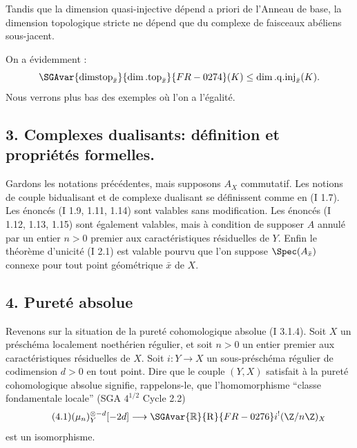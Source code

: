 Tandis que la dimension quasi-injective dépend a priori de l'Anneau 
de base, la
dimension topologique stricte ne dépend que du complexe de faisceaux abéliens sous-jacent.

On a évidemment :
\[
        \SGAvar{\operatorname{dimstop}_{\bar{x}}}{\dim.\mathrm{top}_{\bar{x}}}{FR-0274}(K)\leq \dim.\mathrm{q.inj}_{\bar{x}}(K).
\]
Nous verrons plus bas des exemples où l'on a l'égalité.

\subsection*{3. Complexes dualisants: définition et propriétés formelles.}

Gardons les notations précédentes, mais supposons $A_X$ commutatif. Les notions de couple bidualisant et de complexe dualisant se définissent comme en (I 1.7). Les énoncés (I 1.9, 1.11, 1.14) sont valables sans modification. Les énoncés (I 1.12, 1.13, 1.15) sont également valables, mais à condition de supposer $A$ annulé par un entier $n>0$ premier aux caractéristiques résiduelles de $Y$. Enfin le théorème d'unicité (I 2.1) est valable pourvu que l'on suppose $\Spec(A_{\bar{x}})$ connexe pour tout point géométrique $\bar{x}$ de $X$.

\subsection*{4. Pureté absolue}

Revenons sur la situation de la pureté cohomologique absolue (I 3.1.4). Soit $X$ un préschéma localement noethérien régulier, et soit $n>0$ un entier premier aux caractéristiques résiduelles de $X$. Soit $i:Y\to X$ un sous-préschéma régulier de codimension $d>0$ en tout point. Dire que le couple $(Y,X)$ satisfait à la pureté cohomologique absolue signifie, rappelons-le, que l'homomorphisme ``classe fondamentale locale'' (SGA $4^{1/2}$ Cycle 2.2)
\begin{equation}\tag{4.1}
        (\mu_n)_Y^{\otimes -d}[-2d]\longrightarrow \SGAvar{\mathbb{R}}{\mathrm{R}}{FR-0276} i^!(\Z/n\Z)_X
\end{equation}
est un
isomorphisme.

